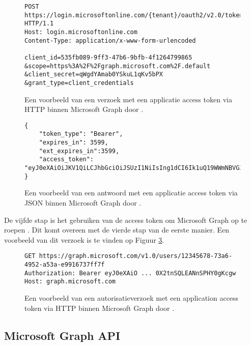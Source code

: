 \begin{figure}[!h]
    \scriptsize
    \begin{verbatim}
POST https://login.microsoftonline.com/{tenant}/oauth2/v2.0/token HTTP/1.1
Host: login.microsoftonline.com
Content-Type: application/x-www-form-urlencoded

client_id=535fb089-9ff3-47b6-9bfb-4f1264799865
&scope=https%3A%2F%2Fgraph.microsoft.com%2F.default
&client_secret=qWgdYAmab0YSkuL1qKv5bPX
&grant_type=client_credentials 
    \end{verbatim}    
    \caption[Voorbeeld Application Token Request Microsoft Graph]{Een voorbeeld van een verzoek met een applicatie access token via \ac{HTTP} binnen Microsoft Graph door \textcite{Microsoft2023s}.}
    \label{MSGATRR}
\end{figure}

\begin{figure}[!h]
    \scriptsize
    \begin{verbatim}
{
    "token_type": "Bearer",
    "expires_in": 3599,
    "ext_expires_in":3599,
    "access_token": "eyJ0eXAiOiJKV1QiLCJhbGciOiJSUzI1NiIsIng1dCI6Ik1uQ19WWmNBVGZNNXBP..."
} 
    \end{verbatim}    
    \caption[Voorbeeld Application Token Response Microsoft Graph]{Een voorbeeld van een antwoord met een applicatie access token via \ac{JSON} binnen Microsoft Graph door \textcite{Microsoft2023s}.}
    \label{MSGATRRES}
\end{figure}

De vijfde stap is het gebruiken van de access token om Microsoft Graph op te roepen \autocite{Microsoft2023s}. Dit komt overeen met de vierde stap van de eerste manier. Een voorbeeld van dit verzoek is te vinden op Figuur \ref{MSGAAT}.

\begin{figure}[!h]
    \scriptsize
    \begin{verbatim}
GET https://graph.microsoft.com/v1.0/users/12345678-73a6-4952-a53a-e9916737ff7f
Authorization: Bearer eyJ0eXAiO ... 0X2tnSQLEANnSPHY0gKcgw
Host: graph.microsoft.com
    \end{verbatim}    
    \caption[Voorbeeld Application autorisatieverzoek Microsoft Graph]{Een voorbeeld van een autorisatieverzoek met een application access token via \ac{HTTP} binnen Microsoft Graph door \textcite{Microsoft2023s}.}
    \label{MSGAAT}
\end{figure}



\subsection{Microsoft Graph API}

